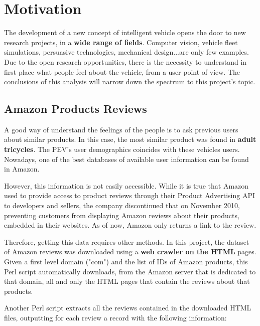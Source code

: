 \newpage
\section{Motivation}

The development of a new concept of intelligent vehicle opens the door to new research projects, in a \textbf{wide range of fields}. Computer vision, vehicle fleet simulations, persuasive technologies, mechanical design...are only few examples. Due to the open research opportunities, there is the necessity to understand in first place what people feel about the vehicle, from a user point of view. The conclusions of this analysis will narrow down the spectrum to this project's topic.

\subsection{Amazon Products Reviews}


A good way of understand the feelings of the people is to ask previous users about similar products. In this case, the most similar product was found in \textbf{adult tricycles}. The PEV's user demographics coincides with these vehicles users. Nowadays, one of the best databases of available user information can be found in Amazon\cite{Amazon}.

However, this information is not easily accessible. While it is true that Amazon used to provide access to product reviews through their Product Advertising API to developers and sellers, the company discontinued that on November 2010, preventing customers from displaying Amazon reviews about their products, embedded in their websites. As of now, Amazon only returns a link to the review.

Therefore, getting this data requires other methods. In this project, the dataset of Amazon reviews was downloaded using a \textbf{web crawler on the HTML} pages\cite{perl}. Given a first level domain ("com") and the list of IDs of Amazon products, this Perl script automatically downloads, from the Amazon server that is dedicated to that domain, all and only the HTML pages that contain the reviews about that products.

Another Perl script extracts all the reviews contained in the downloaded HTML files, outputting for each review a record with the following information:

